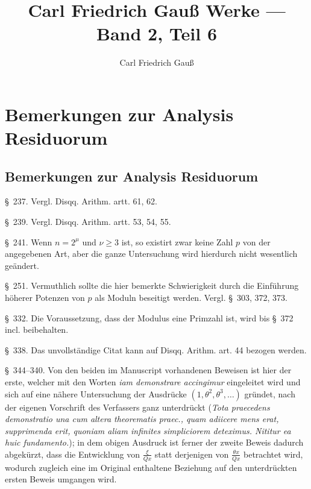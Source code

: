 \documentclass[12pt,a4paper]{article}
\title{Carl Friedrich Gau\ss{} Werke --- Band 2, Teil 6}
\author{Carl Friedrich Gau\ss{}}
\date{}
\begin{document}
\maketitle
\thispagestyle{fancy}

\section*{Bemerkungen zur Analysis Residuorum}

\subsection*{Bemerkungen zur Analysis Residuorum}

\noindent
\S\ 237. Vergl. Disqq. Arithm. artt. 61, 62.

\S\ 239. Vergl. Disqq. Arithm. artt. 53, 54, 55.

\S\ 241. Wenn $n=2^\mu$ und $\nu\ge 3$ ist, so existirt zwar keine Zahl $p$ von der angegebenen Art, aber die ganze Untersuchung wird hierdurch nicht wesentlich ge\"andert.

\S\ 251. Vermuthlich sollte die hier bemerkte Schwierigkeit durch die Einf\"uhrung h\"oherer Potenzen von $p$ als Moduln beseitigt werden. Vergl. \S\ 303, 372, 373.

\S\ 332. Die Voraussetzung, dass der Modulus eine Primzahl ist, wird bis \S\ 372 incl. beibehalten.

\S\ 338. Das unvollst\"andige Citat kann auf Disqq. Arithm. art. 44 bezogen werden.

\S\ 344--340. Von den beiden im Manuscript vorhandenen Beweisen ist hier der erste, welcher mit den Worten \textit{iam demonstrare accingimur} eingeleitet wird und sich auf eine n\"ahere Untersuchung der Ausdr\"ucke $(1,\theta^2,\theta^3,\ldots)$ gr\"undet, nach der eigenen Vorschrift des Verfassers ganz unterdr\"uckt (\textit{Tota praecedens demonstratio una cum altera theorematis praec., quam adiicere mens erat, supprimenda erit, quoniam aliam infinites simpliciorem deteximus. Nititur ea huic fundamento.}); in dem obigen Ausdruck ist ferner der zweite Beweis dadurch abgek\"urzt, dass die Entwicklung von $\frac{\xi}{Qx}$ statt derjenigen von $\frac{\theta x}{Qx}$ betrachtet wird, wodurch zugleich eine im Original enthaltene Beziehung auf den unterdr\"uckten ersten Beweis umgangen wird.
\end{document}
